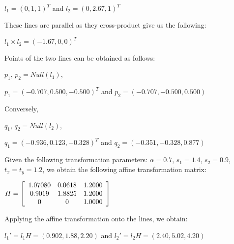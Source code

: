 \documentclass[]{article}
\begin{document}
\vspace{0.5em}

\centerline {
	$l_1 = (0, 1, 1)^T$ and $l_2=(0,2.67,1)^T$
}

\vspace{0.5em}

These lines are parallel as they cross-product give us the following:

\vspace{0.5em}

\centerline {
	$l_1 \times l_2 = (-1.67, 0, 0)^T$
}

\vspace{0.5em}
Points of the two lines can be obtained as follows:

\vspace{0.5em}

\centerline {
	$p_1$, $p_2 = Null(l_1)$, 
}

\vspace{0.5em}

\centerline {
	$p_1=(-0.707, 0.500, -0.500)^T$ and $p_2=(-0.707, -0.500, 0.500)$ 
}

\vspace{0.5em}

Conversely, 


\centerline {
	$q_1$, $q_2 = Null(l_2)$, 
}

\vspace{0.5em}

\centerline {
	$q_1=(-0.936, 0.123, -0.328)^T$ and $q_2=(-0.351, -0.328, 0.877)$ 
}

Given the following transformation parameters: $\alpha = 0.7$, $s_1=1.4$, $s_2=0.9$, $t_x=t_y=1.2$, we obtain the following affine transformation matrix:

\vspace{0.5em}

\centerline {
	$H = \left[ {\begin{array}{*{20}c}
		1.07080 & 0.0618 & 1.2000 \\
		0.9019 & 1.8825 & 1.2000 \\
		0 & 0 & 1.0000
		\end{array} } \right] $
}

\vspace{0.5em}

Applying the affine transformation onto the lines, we obtain:

\vspace{0.5em}

\centerline {
	$l_1' = l_1H = (0.902, 1.88, 2.20)$ and $l_2' = l_2H = (2.40, 5.02, 4.20)$ 
}
\end{document}
